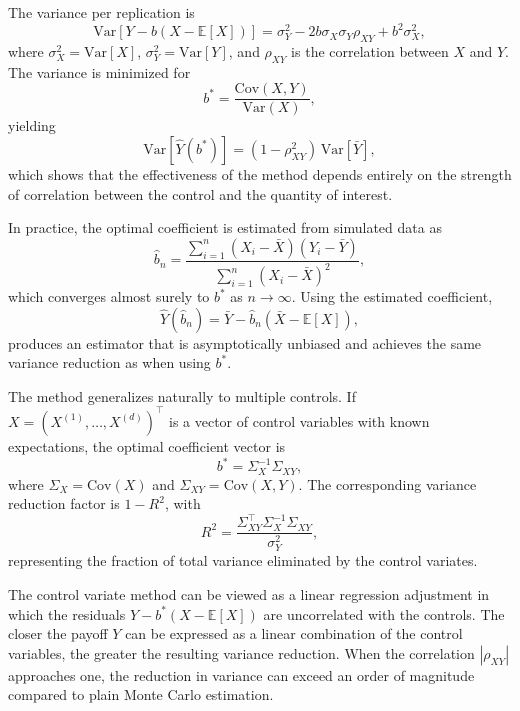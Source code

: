 \begin{remark}
The variance per replication is
\[
\mathrm{Var}[Y - b(X - \mathbb{E}[X])] = \sigma_Y^2 - 2b\sigma_X\sigma_Y\rho_{XY} + b^2\sigma_X^2,
\]
where \(\sigma_X^2 = \mathrm{Var}[X]\), \(\sigma_Y^2 = \mathrm{Var}[Y]\), and \(\rho_{XY}\) is the correlation between \(X\) and \(Y\).  
The variance is minimized for
\[
b^\ast = \frac{\mathrm{Cov}(X,Y)}{\mathrm{Var}(X)},
\]
yielding
\[
\mathrm{Var}[\widehat{Y}(b^\ast)] = (1 - \rho_{XY}^2)\,\mathrm{Var}[\bar{Y}],
\]
which shows that the effectiveness of the method depends entirely on the strength of correlation between the control and the quantity of interest.
\end{remark}

\begin{remark}
In practice, the optimal coefficient is estimated from simulated data as
\[
\hat{b}_n = 
\frac{\sum_{i=1}^n (X_i - \bar{X})(Y_i - \bar{Y})}
     {\sum_{i=1}^n (X_i - \bar{X})^2},
\]
which converges almost surely to \(b^\ast\) as \(n \to \infty\).  
Using the estimated coefficient,
\[
\widehat{Y}(\hat{b}_n) = \bar{Y} - \hat{b}_n(\bar{X} - \mathbb{E}[X]),
\]
produces an estimator that is asymptotically unbiased and achieves the same variance reduction as when using \(b^\ast\).
\end{remark}

\begin{remark}
The method generalizes naturally to multiple controls.  
If \(X = (X^{(1)},\dots,X^{(d)})^\top\) is a vector of control variables with known expectations, the optimal coefficient vector is
\[
b^\ast = \Sigma_X^{-1}\Sigma_{XY},
\]
where \(\Sigma_X = \mathrm{Cov}(X)\) and \(\Sigma_{XY} = \mathrm{Cov}(X,Y)\).  
The corresponding variance reduction factor is \(1 - R^2\), with
\[
R^2 = \frac{\Sigma_{XY}^\top \Sigma_X^{-1}\Sigma_{XY}}{\sigma_Y^2},
\]
representing the fraction of total variance eliminated by the control variates.
\end{remark}

\begin{remark}[Interpretation]
The control variate method can be viewed as a linear regression adjustment in which the residuals \(Y - b^\ast(X - \mathbb{E}[X])\) are uncorrelated with the controls.  
The closer the payoff \(Y\) can be expressed as a linear combination of the control variables, the greater the resulting variance reduction.  
When the correlation \(|\rho_{XY}|\) approaches one, the reduction in variance can exceed an order of magnitude compared to plain Monte Carlo estimation.
\end{remark}
